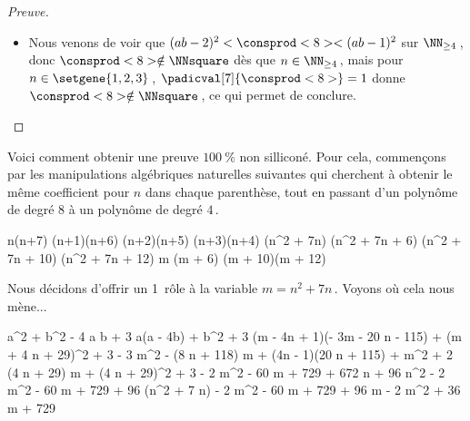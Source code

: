 \begin{proof}[Preuve]
	\begin{itemize}
		\item Nous venons de voir que $( a b - 2)^2 < \consprod<8> < ( a b - 1)^2$ sur $\NN_{\geq 4}$\,, donc $\consprod<8> \notin \NNsquare$ dès que $n \in \NN_{\geq 4}$\,, mais pour $n \in \setgene{1, 2, 3}$\,, $\padicval[7]{\consprod<8>} =1$ donne $\consprod<8> \notin \NNsquare$\,, ce qui permet de conclure.
	\end{itemize}
\end{proof}




\begin{remark} \label{no-silicon}
	Voici comment obtenir une preuve $\qty{100}{\percent}$ non silliconé.
	Pour cela, commençons par les manipulations algébriques naturelles suivantes qui cherchent à obtenir le même coefficient pour $n$ dans chaque parenthèse, tout en passant d'un polynôme de degré $8$ à un polynôme de degré $4$\,.
    
    \medskip
    
    \begin{stepcalc}[style = sar]
    \explnext{}
    	n(n+7) \cdot (n+1)(n+6) \cdot (n+2)(n+5) \cdot (n+3)(n+4)
    \explnext{}
    	(n^2 + 7n) \cdot (n^2 + 7n + 6) \cdot (n^2 + 7n + 10) \cdot (n^2 + 7n + 12)
    	m (m + 6) (m + 10)(m + 12)
    \end{stepcalc}
    
    \medskip
    Nous décidons d'offrir un 1\ier\ rôle à la variable $m = n^2 + 7n$\,. Voyons où cela nous mène...
    
	\medskip
	\begin{stepcalc}[style = ar*, ope={=}]
    	a^2 + b^2 - 4 a b + 3
    \explnext{}
    	a(a - 4b) + b^2 + 3
    	(m - 4n + 1)(- 3m - 20 n - 115) 
		+
		(m + 4 n + 29)^2
		+
		3
    \explnext{}
    	- 3 m^2 - (8 n + 118) m + (4n - 1)(20 n + 115)
		+
		m^2 + 2 (4 n + 29) m
		+
		(4 n + 29)^2
		+
		3
    \explnext{}
    	- 2 m^2
		- 60 m 
		+
		729 + 672 n + 96 n^2
    	- 2 m^2
		- 60 m 
		+ 729 + 96 (n^2 + 7 n)
    \explnext{}
    	- 2 m^2
		- 60 m 
		+ 729 + 96 m
    \explnext{}
    	- 2 m^2 + 36 m + 729
    \end{stepcalc}
\end{remark}

